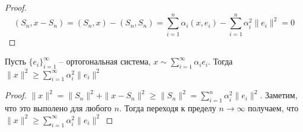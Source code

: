 \documentclass[document.tex]{subfiles}
\begin{document}
\begin{proof}
    \[
        (S_n, x - S_n) = (S_n, x) - (S_n, S_n) = \sum_{i = 1}^n \alpha_i (x, e_i) - \sum_{i = 1}^n \alpha_i^2 \|e_i\|^2 =
        0
    \]
\end{proof}

\begin{theorem}
    Пусть $\{e_i\}_{i = 1}^{\infty}$ -- ортогональная система, $x \sim \sum_{i = 1}^{\infty} \alpha_i e_i$. Тогда
    $\|x\|^2 \geq \sum_{i = 1}^{\infty} \alpha_i^2 \|e_i\|^2$
\end{theorem}

\begin{proof}
    $\|x\|^2 = \|S_n\|^2 + \|x - S_n\|^2 \geq \|S_n\|^2 = \sum_{i = 1}^n \alpha_i^2 \|e_i\|^2$. Заметим, что это
    выполено для любого $n$. Тогда переходя к пределу $n \rightarrow \infty$ получаем, что $\|x\|^2 \geq \sum_{i =
    1}^{\infty} \alpha_i^2 \|e_i\|^2$
\end{proof}

\begin{theorem}

\end{theorem}
\end{document}

